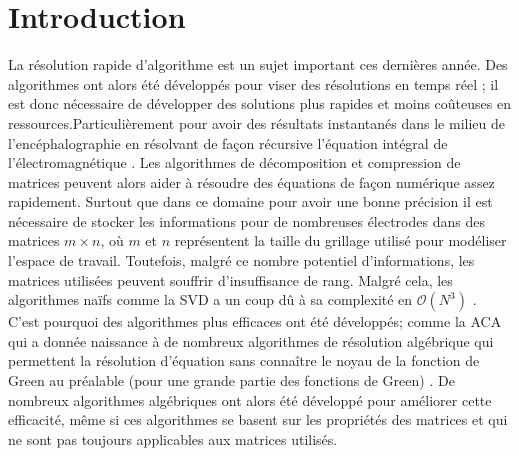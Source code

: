 \documentclass[10pt]{SelfArx} %
\affiliation{\textsuperscript{1}\textit{Étudiant en cycle d'ingénieur généraliste, IMT Atlantique}} %
\affiliation{*\textbf{mail}: zaccarie.kanit@imt-atlantique.net} %
\begin{document}
\maketitle %

\tableofcontents %

\thispagestyle{empty} %


\section*{Introduction} %


La résolution rapide d'algorithme est un sujet important ces dernières année. Des algorithmes ont alors été développés pour viser des résolutions en temps réel ; il est donc nécessaire de développer des solutions plus rapides et moins coûteuses en ressources.Particulièrement pour avoir des résultats instantanés dans le milieu de l'encéphalographie en résolvant de façon récursive  l'équation intégral de l'électromagnétique \cite{tamayo_multilevel_2011}. Les algorithmes de décomposition et compression de matrices peuvent alors aider à résoudre des équations de façon numérique assez rapidement. Surtout que dans ce domaine pour avoir une bonne précision il est nécessaire de stocker les informations pour de nombreuses électrodes dans des matrices $m \times n$, où $m$ et $n$ représentent la taille du grillage utilisé pour modéliser l'espace de travail. Toutefois, malgré ce nombre potentiel d'informations, les matrices utilisées peuvent souffrir d'insuffisance de rang. Malgré cela, les algorithmes naïfs comme la SVD a un coup dû à sa complexité en $\mathcal{O}(N^3)$ \cite{bebendorf_hierarchical_2008}. C'est pourquoi des algorithmes plus efficaces ont été développés; comme la ACA \cite{zhao_adaptive_2005} qui a donnée naissance à de nombreux algorithmes de résolution algébrique qui permettent la résolution d'équation sans connaître le noyau de la fonction de Green au préalable (pour une grande partie des fonctions de Green) \cite{bebendorf_hierarchical_2008}. De nombreux algorithmes algébriques ont alors été développé pour améliorer cette efficacité, même si ces algorithmes se basent sur les propriétés des matrices \cite{ida_parallel_2014} et qui ne sont pas toujours applicables aux matrices utilisés. 
\end{document}
